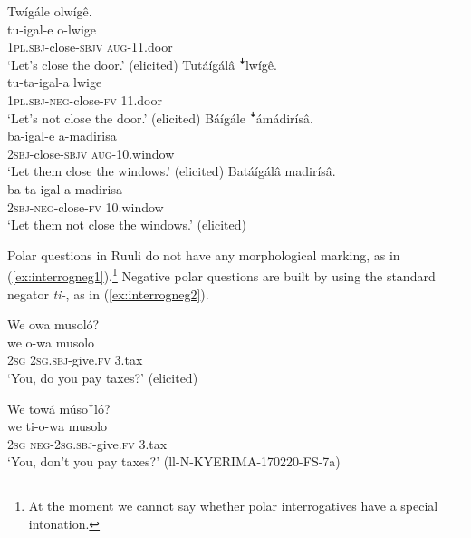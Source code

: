 \documentclass[output=paper,colorlinks,citecolor=brown,draftmode]{langscibook}
\begin{document}
\ea \label{ex:moods}\label{ex:ruulietal:11}
\begin{xlist}
	\ex \label{ex:hortative}
	\glll   Twígále olwígê.\\
	        tu-igal-e o-lwige\\
		    1\textsc{pl.sbj}-close-\textsc{sbjv} \textsc{aug}-11.door\\
	\glt ‘Let's close the door.’  (elicited)
\ex \label{ex:hortativeneg}
	\glll   Tutáígálâ ꜜlwígê.\\
	        tu-ta-igal-a lwige\\
    		1\textsc{pl.sbj}-\textsc{neg}-close-\textsc{fv} 11.door\\
	\glt ‘Let's not close the door.’  (elicited)
\ex \label{ex:jussive}
	\glll   Báígále ꜜámádirísâ.\\
	        ba-igal-e a-madirisa\\
		    2\textsc{sbj}-close-\textsc{sbjv} \textsc{aug}-10.window\\
	\glt ‘Let them close the windows.’  (elicited)
\ex \label{ex:jussiveneg}
	\glll  Batáígálâ madirísâ.\\
	        ba-ta-igal-a madirisa\\
		    2\textsc{sbj}-\textsc{neg}-close-\textsc{fv} 10.window\\
	\glt ‘Let them not close the windows.’ (elicited)
\end{xlist}
\z

Polar questions in Ruuli do not have any morphological marking, as in (\ref{ex:interrogneg1}).\footnote{At the moment we cannot say whether polar interrogatives have a special intonation.} 
Negative polar questions are built by using the standard negator \textit{ti-}, as in (\ref{ex:interrogneg2}).

\ea \label{ex:interrogneg}
\begin{xlist}
\ex \label{ex:interrogneg1}
	\glll  We owa musoló?\\
	        we o-wa musolo\\
		    2\textsc{sg}	2\textsc{sg.sbj}-give.\textsc{fv} 3.tax\\
	\glt `You, do you pay taxes?'  (elicited)
	
\ex \label{ex:interrogneg2}
	\glll  We towá músoꜜló?\\
	        we ti-o-wa musolo\\
	    	2\textsc{sg}	\textsc{neg}-2\textsc{sg.sbj}-give.\textsc{fv} 3.tax\\
	\glt `You, don't you pay taxes?' (ll-N-KYERIMA-170220-FS-7a)
\end{xlist}
\z
\end{document}
